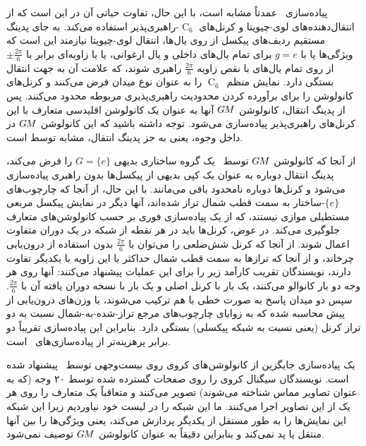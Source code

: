 پیاده‌سازی~\citet{gaugeIco2019} عمدتاً مشابه است، با این حال، تفاوت حیاتی آن در این است که از انتقال‌دهنده‌های لوی-چیویتا و کرنل‌های $\operatorname{C}_6$-راهبری‌پذیر استفاده می‌کند.
به جای پدینگ مستقیم ردیف‌های پیکسل از روی یال‌ها، انتقال لوی-چیویتا نیازمند این است که ویژگی‌ها یا با $g=e$ برای تمام یال‌های داخلی و یال ارغوانی، یا با زاویه‌ای برابر با $\pm\frac{2\pi}{6}$ از روی تمام یال‌های با نقص زاویه $\frac{2\pi}{6}$ راهبری شوند، که علامت آن به جهت انتقال بستگی دارد.
\citet{gaugeIco2019} نمایش منظم~$\operatorname{C}_6$ را به عنوان نوع میدان فرض می‌کنند و کرنل‌های کانولوشن را برای برآورده کردن محدودیت راهبری‌پذیری مربوطه محدود می‌کنند.
پس از پدینگ انتقال، کانولوشن $G\mkern-1.4muM$ آنها به عنوان یک کانولوشن اقلیدسی متعارف با این کرنل‌های راهبری‌پذیر پیاده‌سازی می‌شود.
توجه داشته باشید که این کانولوشن $G\mkern-1.4muM$ در داخل وجوه، یعنی به جز پدینگ انتقال، مشابه  توسط \citet{Hoogeboom2018-HEX} است.


از آنجا که کانولوشن $G\mkern-1.4muM$ توسط~\citet{zhang2019orientation} یک گروه ساختاری بدیهی $G=\{e\}$ را فرض می‌کند، پدینگ انتقال دوباره به عنوان یک کپی بدیهی از پیکسل‌ها بدون راهبری پیاده‌سازی می‌شود و کرنل‌ها دوباره نامحدود باقی می‌مانند.
با این حال، از آنجا که چارچوب‌های $\{e\}$-ساختار به سمت قطب شمال تراز شده‌اند، آنها دیگر در نمایش پیکسل مربعی مستطیلی موازی نیستند، که از یک پیاده‌سازی فوری بر حسب کانولوشن‌های متعارف جلوگیری می‌کند.
در عوض، کرنل‌ها باید در هر نقطه از شبکه در یک دوران متفاوت اعمال شوند.
از آنجا که کرنل شش‌ضلعی را می‌توان با $\frac{2\pi}{6}$ بدون استفاده از درون‌یابی چرخاند، و از آنجا که ترازها به سمت قطب شمال حداکثر با این زاویه با یکدیگر تفاوت دارند، نویسندگان تقریب کارآمد زیر را برای این عملیات پیشنهاد می‌کنند:
آنها روی هر وجه دو بار کانوالو می‌کنند، یک بار با کرنل اصلی و یک بار با نسخه دوران یافته آن با $\frac{2\pi}{6}$.
سپس دو میدان پاسخ به صورت خطی با هم ترکیب می‌شوند، با وزن‌های درون‌یابی از پیش محاسبه شده که به زوایای چارچوب‌های مرجع تراز-شده-به-شمال نسبت به دو تراز کرنل (یعنی نسبت به شبکه پیکسلی) بستگی دارد.
بنابراین این پیاده‌سازی تقریباً دو برابر پرهزینه‌تر از پیاده‌سازی‌های~\cite{liu2018icoAltAz,gaugeIco2019} است.


یک پیاده‌سازی جایگزین از کانولوشن‌های کروی روی بیست‌وجهی توسط~\citet{eder2020tangent} پیشنهاد شده است.
نویسندگان سیگنال کروی را روی صفحات گسترده شده توسط ۲۰ وجه (که به عنوان تصاویر مماس شناخته می‌شوند) تصویر می‌کنند و متعاقباً یک  متعارف را روی هر یک از این تصاویر اجرا می‌کنند.
ما این شبکه را در لیست خود نیاوردیم زیرا این شبکه این نمایش‌ها را به طور مستقل از یکدیگر پردازش می‌کند، یعنی ویژگی‌ها را بین آنها منتقل یا پد نمی‌کند و بنابراین دقیقاً به عنوان کانولوشن $G\mkern-1.4muM$ توصیف نمی‌شود.


